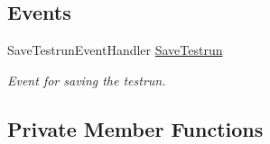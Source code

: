 \subsection*{Events}
\begin{DoxyCompactItemize}
\item 
Save\+Testrun\+Event\+Handler \hyperlink{class_web_analyzer_1_1_controller_1_1_test_controller_a45f8340dcea78391a3f58e5c7996d126}{Save\+Testrun}
\begin{DoxyCompactList}\small\item\em Event for saving the testrun. \end{DoxyCompactList}\end{DoxyCompactItemize}
\subsection*{Private Member Functions}
